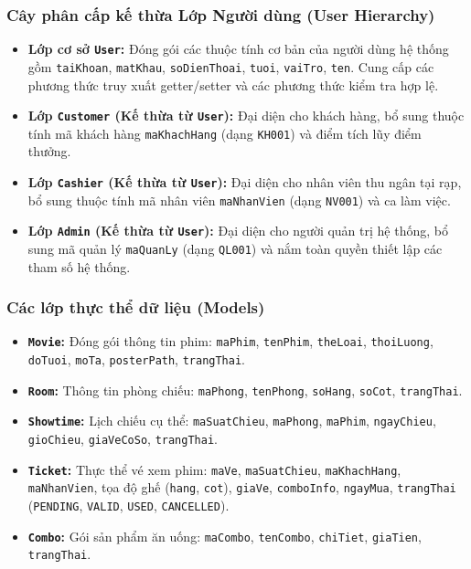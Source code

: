 \documentclass[12pt,a4paper]{article}
\begin{document}
\subsubsection{Cây phân cấp kế thừa Lớp Người dùng (User Hierarchy)}
\begin{itemize}
    \item \textbf{Lớp cơ sở \texttt{User}:} Đóng gói các thuộc tính cơ bản của người dùng hệ thống gồm \texttt{taiKhoan}, \texttt{matKhau}, \texttt{soDienThoai}, \texttt{tuoi}, \texttt{vaiTro}, \texttt{ten}. Cung cấp các phương thức truy xuất getter/setter và các phương thức kiểm tra hợp lệ.
    \item \textbf{Lớp \texttt{Customer} (Kế thừa từ \texttt{User}):} Đại diện cho khách hàng, bổ sung thuộc tính mã khách hàng \texttt{maKhachHang} (dạng \texttt{KH001}) và điểm tích lũy điểm thưởng.
    \item \textbf{Lớp \texttt{Cashier} (Kế thừa từ \texttt{User}):} Đại diện cho nhân viên thu ngân tại rạp, bổ sung thuộc tính mã nhân viên \texttt{maNhanVien} (dạng \texttt{NV001}) và ca làm việc.
    \item \textbf{Lớp \texttt{Admin} (Kế thừa từ \texttt{User}):} Đại diện cho người quản trị hệ thống, bổ sung mã quản lý \texttt{maQuanLy} (dạng \texttt{QL001}) và nắm toàn quyền thiết lập các tham số hệ thống.
\end{itemize}

\subsubsection{Các lớp thực thể dữ liệu (Models)}
\begin{itemize}
    \item \textbf{\texttt{Movie}:} Đóng gói thông tin phim: \texttt{maPhim}, \texttt{tenPhim}, \texttt{theLoai}, \texttt{thoiLuong}, \texttt{doTuoi}, \texttt{moTa}, \texttt{posterPath}, \texttt{trangThai}.
    \item \textbf{\texttt{Room}:} Thông tin phòng chiếu: \texttt{maPhong}, \texttt{tenPhong}, \texttt{soHang}, \texttt{soCot}, \texttt{trangThai}.
    \item \textbf{\texttt{Showtime}:} Lịch chiếu cụ thể: \texttt{maSuatChieu}, \texttt{maPhong}, \texttt{maPhim}, \texttt{ngayChieu}, \texttt{gioChieu}, \texttt{giaVeCoSo}, \texttt{trangThai}.
    \item \textbf{\texttt{Ticket}:} Thực thể vé xem phim: \texttt{maVe}, \texttt{maSuatChieu}, \texttt{maKhachHang}, \texttt{maNhanVien}, tọa độ ghế (\texttt{hang}, \texttt{cot}), \texttt{giaVe}, \texttt{comboInfo}, \texttt{ngayMua}, \texttt{trangThai} (\texttt{PENDING}, \texttt{VALID}, \texttt{USED}, \texttt{CANCELLED}).
    \item \textbf{\texttt{Combo}:} Gói sản phẩm ăn uống: \texttt{maCombo}, \texttt{tenCombo}, \texttt{chiTiet}, \texttt{giaTien}, \texttt{trangThai}.
\end{itemize}
\end{document}
